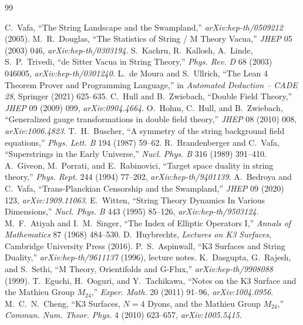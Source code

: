\documentclass[11pt,a4paper]{article}
\theoremstyle{remark}
\begin{document}
\begin{thebibliography}{99}

 C.~Vafa, ``The String Landscape and the Swampland,'' \textit{arXiv:hep-th/0509212} (2005).
 M.~R.~Douglas, ``The Statistics of String / M Theory Vacua,'' \textit{JHEP} 05 (2003) 046, \textit{arXiv:hep-th/0303194}.
 S.~Kachru, R.~Kallosh, A.~Linde, S.~P.~Trivedi, ``de Sitter Vacua in String Theory,'' \textit{Phys. Rev. D} 68 (2003) 046005, \textit{arXiv:hep-th/0301240}.
 L.~de Moura and S.~Ullrich, ``The Lean 4 Theorem Prover and Programming Language,'' in \textit{Automated Deduction -- CADE 28}, Springer (2021) 625--635.
 C.~Hull and B.~Zwiebach, ``Double Field Theory,'' \textit{JHEP} 09 (2009) 099, \textit{arXiv:0904.4664}.
 O.~Hohm, C.~Hull, and B.~Zwiebach, ``Generalized gauge transformations in double field theory,'' \textit{JHEP} 08 (2010) 008, \textit{arXiv:1006.4823}.
 T.~H.~Buscher, ``A symmetry of the string background field equations,'' \textit{Phys. Lett. B} 194 (1987) 59--62.
 R.~Brandenberger and C.~Vafa, ``Superstrings in the Early Universe,'' \textit{Nucl. Phys. B} 316 (1989) 391--410.
 A.~Giveon, M.~Porrati, and E.~Rabinovici, ``Target space duality in string theory,'' \textit{Phys. Rept.} 244 (1994) 77--202, \textit{arXiv:hep-th/9401139}.
 A.~Bedroya and C.~Vafa, ``Trans-Planckian Censorship and the Swampland,'' \textit{JHEP} 09 (2020) 123, \textit{arXiv:1909.11063}.
 E.~Witten, ``String Theory Dynamics In Various Dimensions,'' \textit{Nucl. Phys. B} 443 (1995) 85--126, \textit{arXiv:hep-th/9503124}.
 M.~F.~Atiyah and I.~M.~Singer, ``The Index of Elliptic Operators I,'' \textit{Annals of Mathematics} 87 (1968) 484--530.
 D.~Huybrechts, \textit{Lectures on K3 Surfaces}, Cambridge University Press (2016).
 P.~S.~Aspinwall, ``K3 Surfaces and String Duality,'' \textit{arXiv:hep-th/9611137} (1996), lecture notes.
 K.~Dasgupta, G.~Rajesh, and S.~Sethi, ``M Theory, Orientifolds and G-Flux,'' \textit{arXiv:hep-th/9908088} (1999).
 T.~Eguchi, H.~Ooguri, and Y.~Tachikawa, ``Notes on the K3 Surface and the Mathieu Group $M_{24}$,'' \textit{Exper. Math.} 20 (2011) 91--96, \textit{arXiv:1004.0956}.
 M.~C.~N.~Cheng, ``K3 Surfaces, $N=4$ Dyons, and the Mathieu Group $M_{24}$,'' \textit{Commun. Num. Theor. Phys.} 4 (2010) 623--657, \textit{arXiv:1005.5415}.

\end{thebibliography}
\end{document}
